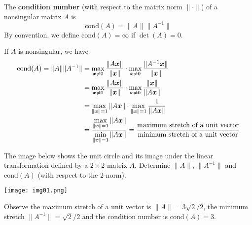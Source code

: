 \begin{definition}
The {\bf condition number} (with respect to the matrix norm $\| \cdot \|$)  \cite[p.55]{MH} of a nonsingular matrix $A$ is
$$
\mathrm{cond}(A) = \| A \| \| A^{-1} \|
$$
By convention, we define $\mathrm{cond}(A) = \infty$ if $\det(A) = 0$.
\end{definition}

\begin{note}
If $A$ is nonsingular, we have
\begin{align*}
\mathrm{cond}(A) = \| A \| \| A^{-1} \|
&= \max_{ \boldsymbol{x} \not= 0} \frac{\| A \boldsymbol{x} \|}{\| \boldsymbol{x} \|} \cdot \max_{ \boldsymbol{x} \not= 0} \frac{\| A^{-1} \boldsymbol{x} \|}{\| \boldsymbol{x} \|} \\
&= \max_{ \boldsymbol{x} \not= 0} \frac{\| A \boldsymbol{x} \|}{\| \boldsymbol{x} \|} \cdot \max_{ \boldsymbol{x} \not= 0} \frac{\| \boldsymbol{x} \|}{\| A \boldsymbol{x} \|} \\
&= \max_{ \| \boldsymbol{x} \| = 1} \| A \boldsymbol{x} \| \cdot \max_{ \| \boldsymbol{x} \| = 1} \frac{1}{\| A \boldsymbol{x} \|} \\
&= \frac{\displaystyle  \max_{\| \boldsymbol{x} \| = 1} \| A \boldsymbol{x} \|}{\displaystyle \min_{ \| \boldsymbol{x} \| = 1} \| A \boldsymbol{x} \|}
= \frac{\text{maximum stretch of a unit vector}}{\text{minimum stretch of a unit vector}}
\end{align*}
\end{note}

\begin{example}
The image below shows the unit circle and its image under the linear transformation defined by a $2 \times 2$ matrix $A$. Determine $\| A \|$, $\| A^{-1} \|$ and $\mathrm{cond}(A)$ (with respect to the 2-norm).
\begin{center}
\texttt{[image: img01.png]}
\end{center}
Observe the maximum stretch of a unit vector is $\| A \| =  3\sqrt{2}/2$, the minimum stretch $\| A^{-1} \| = \sqrt{2}/2$ and the condition number is $\mathrm{cond}(A) = 3$.
\end{example}

